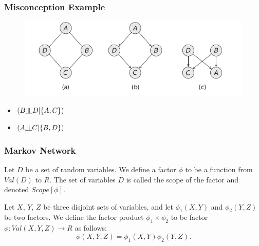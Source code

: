 \documentclass[11pt]{beamer}
\newcommand{\indep}{\rotatebox[origin=c]{90}{$\models$}}
\begin{document}
\begin{frame}
\frametitle{Misconception Example}
\begin{figure}
	\centering
	\includegraphics[width=0.7\linewidth]{pic/misconception}
	\label{fig:misconception}
\end{figure}

\begin{itemize}
	\item $(B \indep D | \{A, C\})$
	\item $(A \indep C | \{B, D\})$
\end{itemize}

\end{frame}

\begin{frame}
\frametitle{Markov Network}
\begin{definition}
	Let $D$ be a set of random variables. We define a factor $\phi$ to be a function from $Val(D)$ to $R$. The set of variables $D$ is called the scope of the factor and denoted $Scope[\phi]$.
\end{definition}

\begin{definition}
	Let $X$, $Y$, $Z$ be three disjoint sets of variables, and let $\phi_1(X, Y)$ and $\phi_2(Y, Z)$ be two factors. We define the factor product $\phi_1 \times \phi_2$ to be factor $\phi: Val(X, Y, Z) \rightarrow R$ as follows:
	\[
		\phi(X, Y, Z)=\phi_1(X, Y) \phi_2(Y, Z).
	\]
\end{definition}
\end{frame}
\end{document}
